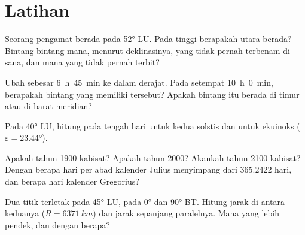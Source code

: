 \section{Latihan}

\begin{exercise}[$\star$]\label{exo:b1:spherical-astronomy:1}
Seorang pengamat berada pada  \ang{52} LU. Pada tinggi berapakah  utara berada? Bintang-bintang mana, menurut deklinasinya, yang tidak pernah terbenam di sana, dan mana yang tidak pernah terbit?
\end{exercise}

\begin{exercise}[$\star$]\label{exo:b1:spherical-astronomy:2}
Ubah  sebesar \qty{6}{h}~\qty{45}{min} ke dalam derajat. Pada  setempat \qty{10}{h}~\qty{0}{min}, berapakah  bintang yang memiliki  tersebut? Apakah bintang itu berada di timur atau di barat meridian?
\end{exercise}

\begin{exercise}[$\star$]\label{exo:b1:spherical-astronomy:3}
Pada  \ang{40} LU, hitung  pada tengah hari untuk kedua solstis dan untuk ekuinoks ($\varepsilon = \ang{23.44}$).
\end{exercise}

\begin{exercise}[$\star$]\label{exo:b1:spherical-astronomy:4}
Apakah tahun 1900 kabisat? Apakah tahun 2000? Akankah tahun 2100 kabisat? Dengan berapa hari per abad kalender Julius menyimpang dari  365.2422 hari, dan berapa hari kalender Gregorius?
\end{exercise}

\begin{exercise}[$\star\star$]\label{exo:b1:spherical-astronomy:5}
Dua titik terletak pada  \ang{45} LU, pada  \ang{0} dan \ang{90} BT. Hitung jarak  di antara keduanya ($R = \qty{6371}{km}$) dan jarak sepanjang paralelnya. Mana yang lebih pendek, dan dengan berapa?
\end{exercise}

